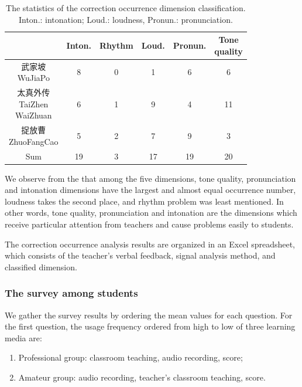 \begin{table}[ht!]
\centering
\begin{tabular}{cccccc}
\toprule
              & Inton.     & Rhythm & Loud. & Pronun. & \makecell{Tone\\quality} \\
\midrule
\makecell{武家坡\\WuJiaPo}          		& 8 	& 0 & 1 	& 6		& 6 \\
\makecell{太真外传\\TaiZhen\\WaiZhuan} 	& 6   	& 1 & 9 	& 4     & 11 \\
\makecell{捉放曹\\ZhuoFangCao}      		& 5  	& 2 & 7 	& 9     & 3 \\
Sum 									& 19 	& 3	& 17 	& 19	& 20 \\
\bottomrule
\end{tabular}
\caption{The statistics of the correction occurrence dimension classification. Inton.: intonation; Loud.: loudness, Pronun.: pronunciation.}
\label{tab:correction_occurrence_dimension_classification}   
\end{table}

We observe from the  that among the five dimensions, tone quality, pronunciation and intonation dimensions have the largest and almost equal occurrence number, loudness takes the second place, and rhythm problem was least mentioned. In other words, tone quality, pronunciation and intonation are the dimensions which receive particular attention from teachers and cause problems easily to students.

The correction occurrence analysis results are organized in an Excel spreadsheet, which consists of the teacher's verbal feedback, signal analysis method, and classified dimension.

\subsubsection{The survey among students}

We gather the survey results by ordering the mean values for each question. For the first question, the usage frequency ordered from high to low of three learning media are: 

\begin{enumerate}[noitemsep]
\item Professional group: classroom teaching, audio recording, score;
\item Amateur group: audio recording, teacher's classroom teaching, score. 
\end{enumerate}

